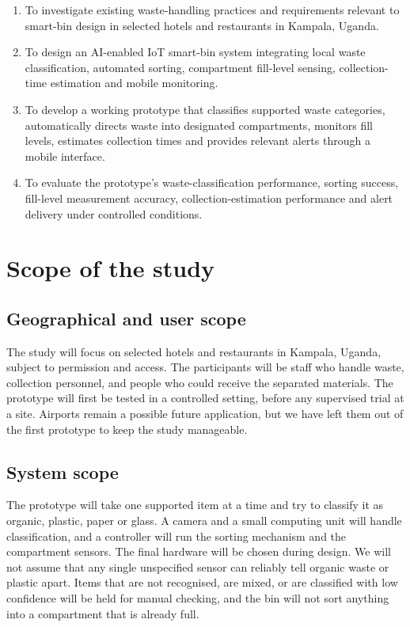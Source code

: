 \documentclass[12pt,a4paper]{report}
\begin{document}
\begin{enumerate}[leftmargin=*,itemsep=0.4em]
\item To investigate existing waste-handling practices and requirements relevant to smart-bin design in selected hotels and restaurants in Kampala, Uganda.
\item To design an AI-enabled IoT smart-bin system integrating local waste classification, automated sorting, compartment fill-level sensing, collection-time estimation and mobile monitoring.
\item To develop a working prototype that classifies supported waste categories, automatically directs waste into designated compartments, monitors fill levels, estimates collection times and provides relevant alerts through a mobile interface.
\item To evaluate the prototype's waste-classification performance, sorting success, fill-level measurement accuracy, collection-estimation performance and alert delivery under controlled conditions.
\end{enumerate}

\section{Scope of the study}

\subsection{Geographical and user scope}

The study will focus on selected hotels and restaurants in Kampala, Uganda, subject to permission and access. The participants will be staff who handle waste, collection personnel, and people who could receive the separated materials. The prototype will first be tested in a controlled setting, before any supervised trial at a site. Airports remain a possible future application, but we have left them out of the first prototype to keep the study manageable.

\subsection{System scope}

The prototype will take one supported item at a time and try to classify it as organic, plastic, paper or glass. A camera and a small computing unit will handle classification, and a controller will run the sorting mechanism and the compartment sensors. The final hardware will be chosen during design. We will not assume that any single unspecified sensor can reliably tell organic waste or plastic apart. Items that are not recognised, are mixed, or are classified with low confidence will be held for manual checking, and the bin will not sort anything into a compartment that is already full.
\end{document}
